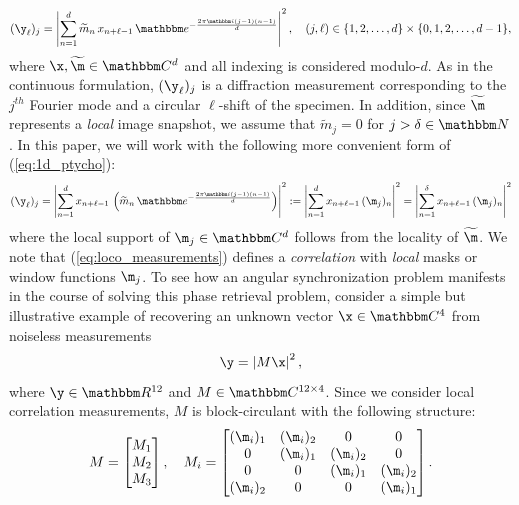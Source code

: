%
\begin{equation}
    (\y_\ell)_j = \left \vert \sum_{n=1}^d \widetilde m_n \, x_{n+\ell-1} \,
      \mathbbm e^{-\frac{2\pi \mathbbm i (j-1) (n-1)}d} 
      \right \vert^2, \quad (j,\ell) \in \{1,2,\dots,d\} \times  
      \{0,1,2,\dots,d-1\}, 
  \label{eq:1d_ptycho}
\end{equation}
%
where $\x, \widetilde \m \in \mathbbm C^d$ and all indexing is
considered modulo-$d$. As in the continuous formulation, $(\y_\ell)_j$
is a diffraction measurement corresponding to the $j^{th}$ Fourier mode
and a circular $\ell$-shift of the specimen. In addition, since
$\widetilde \m$ represents a {\em local} image snapshot, we assume that
$\widetilde m_j = 0$ for $j>\delta \in \mathbbm N$. In this paper, we
will work with the following more convenient form of (\ref{eq:1d_ptycho}):
%
\begin{equation}
    (\y_\ell)_j = \left \vert \sum_{n=1}^d x_{n+\ell-1} \, \left( \widetilde 
        m_n \, \mathbbm e^{-\frac{2\pi \mathbbm i (j-1) (n-1)}d} 
        \right) \right \vert^2 := 
        \left \vert \sum_{n=1}^d x_{n+\ell-1} \, (\m_j)_n \right \vert^2 = 
        \left \vert \sum_{n=1}^\delta x_{n+\ell-1} \, (\m_j)_n \right \vert^2 
  \label{eq:loco_measurements}
\end{equation}
%
where the local support of $\m_j \in \mathbbm C^d$ follows from the
locality of $\widetilde \m$. We note that (\ref{eq:loco_measurements})
defines a {\em correlation} with {\em local} masks or window functions
$\m_j$. To see how an angular synchronization problem manifests in the
course of solving this phase retrieval problem, consider a simple but
illustrative example of recovering an unknown vector $\x \in \mathbbm
C^4$ from noiseless measurements
%
\[ \y = \left \vert M \x \right \vert^2, \]
%
where $\y \in \mathbbm R^{12}$ and $M \in \mathbbm C^{12\times 4}$.
Since we consider local correlation measurements, $M$ is
block-circulant with the following structure: 
%
\[ M =  \begin{bmatrix}
            M_1 \\ M_2 \\ M_3 
        \end{bmatrix}, \quad 
    M_i =   \begin{bmatrix}
                (\m_i)_1 & (\m_i)_2 & 0 & 0 \\
                0 & (\m_i)_1 & (\m_i)_2 & 0 \\
                0 & 0 & (\m_i)_1 & (\m_i)_2 \\
                (\m_i)_2 & 0 & 0 & (\m_i)_1 
            \end{bmatrix}.       \]
